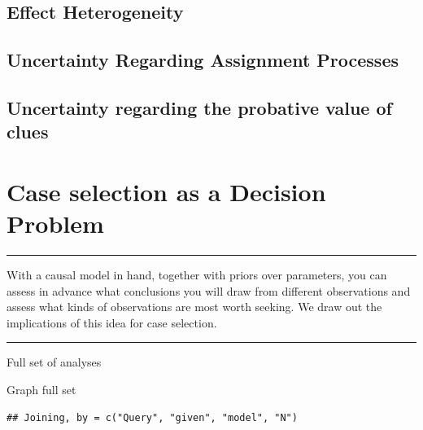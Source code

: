 \documentclass[12pt,]{book}
\begin{document}
\hypertarget{effect-heterogeneity}{%
\section{Effect Heterogeneity}\label{effect-heterogeneity}}

\hypertarget{uncertainty-regarding-assignment-processes}{%
\section{Uncertainty Regarding Assignment Processes}\label{uncertainty-regarding-assignment-processes}}

\hypertarget{uncertainty-regarding-the-probative-value-of-clues}{%
\section{Uncertainty regarding the probative value of clues}\label{uncertainty-regarding-the-probative-value-of-clues}}

\hypertarget{caseselection}{%
\chapter{Case selection as a Decision Problem}\label{caseselection}}

\begin{center}\rule{0.5\linewidth}{\linethickness}\end{center}

With a causal model in hand, together with priors over parameters, you can assess in advance what conclusions you will draw from different observations and assess what kinds of observations are most worth seeking. We draw out the implications of this idea for case selection.

\begin{center}\rule{0.5\linewidth}{\linethickness}\end{center}

Full set of analyses

Graph full set

\begin{verbatim}
## Joining, by = c("Query", "given", "model", "N")
\end{verbatim}
\end{document}
